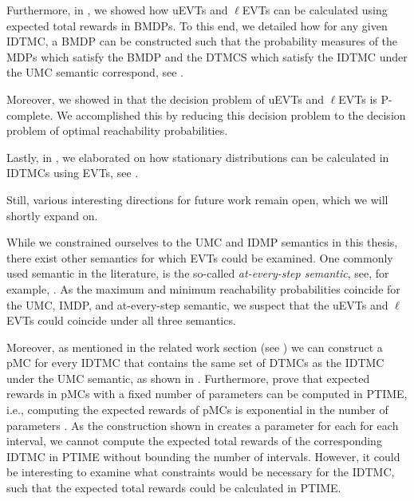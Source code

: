 Furthermore, in , we showed how uEVTs and $\ell$EVTs can be calculated using expected total rewards in BMDPs. To this end, we detailed how for any given IDTMC, a BMDP can be constructed such that the probability measures of the MDPs which satisfy the BMDP and the DTMCS which satisfy the IDTMC under the UMC semantic correspond, see .

Moreover, we showed in  that the decision problem of uEVTs and $\ell$EVTs is P-complete. We accomplished this by reducing this decision problem to the decision problem of optimal reachability probabilities.

Lastly, in , we elaborated on how stationary distributions can be calculated in IDTMCs using EVTs, see .

Still, various interesting directions for future work remain open, which we will shortly expand on.

While we constrained ourselves to the UMC and IDMP semantics in this thesis, there exist other semantics for which EVTs could be examined. One commonly used semantic in the literature, is the so-called \textit{at-every-step semantic}, see, for example, \cite{Semantics_Quant-Analysis,reachability_in_pIMCs_using_constraints}. As the maximum and minimum reachability probabilities coincide for the UMC, IMDP, and at-every-step semantic, we suspect that the uEVTs and $\ell$EVTs could coincide under all three semantics.

Moreover, as mentioned in the related work section (see ) we can construct a pMC for every IDTMC that contains the same set of DTMCs as the IDTMC under the UMC semantic, as shown in \cite{reachability_in_pIMCs_using_constraints}. Furthermore, \cite{Hutschenreiter_pMCs_Intro} prove that expected rewards in pMCs with a fixed number of parameters can be computed in PTIME, i.e., computing the expected rewards of pMCs is exponential in the number of parameters \cite{Jansen_pMC_Servey_Intro}. As the construction shown in \cite{reachability_in_pIMCs_using_constraints} creates a parameter for each for each interval, we cannot compute the expected total rewards of the corresponding IDTMC in PTIME without bounding the number of intervals. However, it could be interesting to examine what constraints would be necessary for the IDTMC, such that the expected total rewards could be calculated in PTIME.

